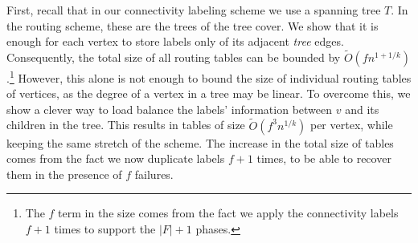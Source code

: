 First, recall that in our connectivity labeling scheme we use a spanning tree $T$. In the routing scheme, these are the trees of the tree cover. We show that it is enough for each vertex to store labels only of its adjacent \emph{tree} edges. 
%
Consequently, the total size of all routing tables can be bounded by $\widetilde{O}(fn^{1+1/k})$.\footnote{The $f$ term in the size comes from the fact we apply the connectivity labels $f+1$ times to support the $|F|+1$ phases.}
However, this alone is not enough to bound the size of individual routing tables of vertices, as the degree of a vertex in a tree may be linear. To overcome this, we show a clever way to load balance the labels' information between $v$ and its children in the tree. This results in tables of size $\widetilde{O}(f^3 n^{1/k})$ per vertex, while keeping the same stretch of the scheme. The increase in the total size of tables comes from the fact we now duplicate labels $f+1$ times, to be able to recover them in the presence of $f$ failures. 